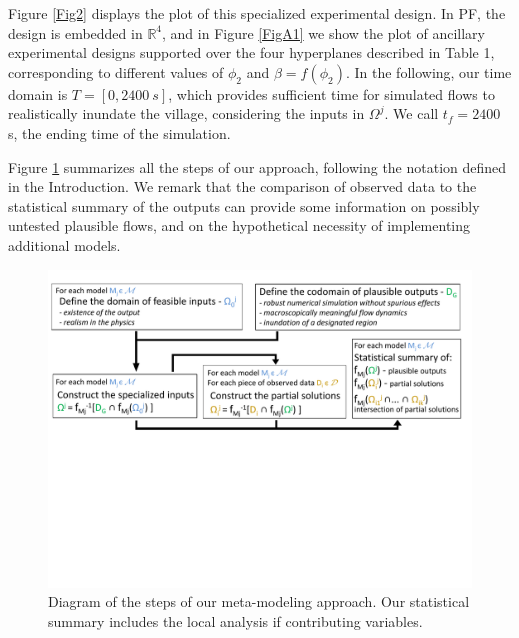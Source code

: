 \documentclass[nhess, manuscript]{copernicus}
\begin{document}
Figure \ref{Fig2} displays the plot of this specialized experimental design. In PF, the design is  embedded in $\mathbb R^4$, and in Figure \ref{FigA1} we show the plot of ancillary experimental designs supported over the four hyperplanes described in Table 1, corresponding to different values of $\phi_2$ and $\beta=f(\phi_2)$. In the following, our time domain is $T=[0,2400\ s]$, which provides sufficient time for simulated flows to realistically inundate the village, considering the inputs in $\Omega^j$. We call $t_f=2400$ s, the ending time of the simulation.

Figure \ref{scheme2} summarizes all the steps of our approach, following the notation defined in the Introduction. We remark that the comparison of observed data to the statistical summary of the outputs can provide some information on possibly untested plausible flows, and on the hypothetical necessity of implementing additional models.

\begin{figure}[H]
\centering
\includegraphics[width=1\textwidth]{diagram.pdf}
\caption{Diagram of the steps of our meta-modeling approach. Our statistical summary includes the local analysis if contributing variables.}
\label{scheme2}
\end{figure}
\end{document}
